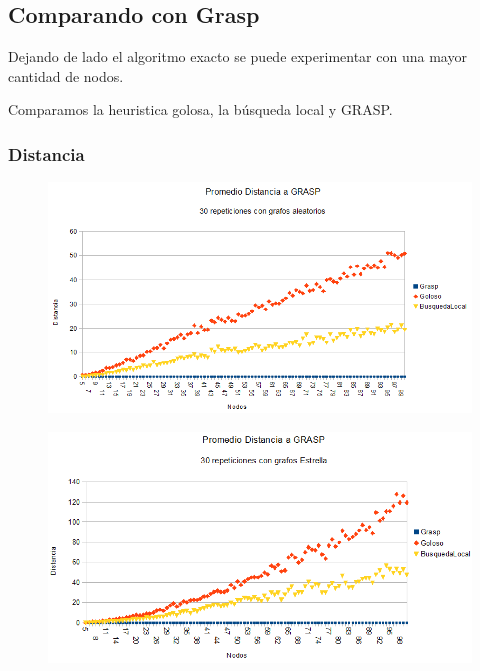 \quad



\subsection{Comparando con Grasp}

\quad Dejando de lado el algoritmo exacto se puede experimentar con una mayor cantidad de nodos.

\quad Comparamos la heuristica golosa, la búsqueda local y GRASP.

\quad 

\subsubsection{Distancia}

\begin{figure}[H]
	\centering
	\includegraphics[scale=0.6]{distancia-Grasp-Azar.png}
\end{figure}

\begin{figure}[H]
	\centering
	\includegraphics[scale=0.6]{distancia-Grasp-Star.png}
\end{figure}


